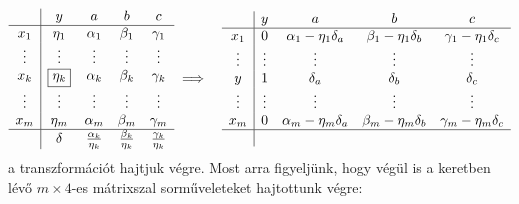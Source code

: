 \documentclass[a4paper, showtrims]{memoir}
\theoremstyle{plain}
\theoremstyle{remark}
\theoremstyle{definition}
\begin{document}
\begin{eqnarray*}
	\begin{array}{c|cccc}
		       & y              & a                       & b                      & c                       \\
		\hline
		x_1    & \eta_1         & \alpha_1                & \beta_1                & \gamma_1                \\
		\vdots & \vdots         & \vdots                  & \vdots                 & \vdots                  \\
		x_k    & \boxed{\eta_k} & \alpha_k                & \beta_k                & \gamma_k                \\
		\vdots & \vdots         & \vdots                  & \vdots                 & \vdots                  \\
		x_m    & \eta_m         & \alpha_m                & \beta_m                & \gamma_m                \\
		\hline
		       & \delta         & \frac{\alpha_k}{\eta_k} & \frac{\beta_k}{\eta_k} & \frac{\gamma_k}{\eta_k} \\
	\end{array}
	&\implies&
	\begin{array}{c|cccc}
		       & y      & a                       & b                      & c                       \\
		\hline
		x_1    & 0      & \alpha_1-\eta_1\delta_a & \beta_1-\eta_1\delta_b & \gamma_1-\eta_1\delta_c \\
		\vdots & \vdots & \vdots                  & \vdots                 & \vdots                  \\
		y      & 1      & \delta_a                & \delta_b               & \delta_c                \\
		\vdots & \vdots & \vdots                  & \vdots                 & \vdots                  \\
		x_m    & 0      & \alpha_m-\eta_m\delta_a & \beta_m-\eta_m\delta_b & \gamma_m-\eta_m\delta_c \\
		\hline
		       &        &
	\end{array}
\end{eqnarray*}
a transzformációt hajtjuk végre.
Most arra figyeljünk,
hogy végül is a keretben lévő $m\times 4$-es mátrixszal sorműveleteket hajtottunk végre:
\end{document}
